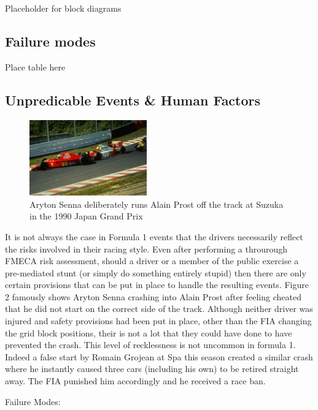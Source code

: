 \documentclass[12pt]{article} %
\begin{document}
Placeholder for block diagrams

\subsection{Failure modes}

Place table here

\subsection{Unpredicable Events \& Human Factors} %


\begin{figure} %
  \begin{center}
    \includegraphics[width=0.45\textwidth]{senna-prost}
  \end{center}
\parbox{7cm}{\caption{Aryton Senna deliberately runs Alain Prost off the track at Suzuka in the 1990 Japan Grand Prix}}
\end{figure}

It is not always the case in Formula 1 events that the drivers necessarily reflect the risks involved in their racing style. Even after performing a throurough FMECA risk assessment, should a driver or a member of the public exercise a pre-mediated stunt (or simply do something entirely stupid) then there are only certain provisions that can be put in place to handle the resulting events. Figure 2 famously shows Aryton Senna crashing into Alain Prost after feeling cheated that he did not start on the correct side of the track. Although neither driver was injured and safety provisions had been put in place, other than the FIA changing the grid block positions, their is not a lot that they could have done to have prevented the crash. This level of recklessness is not uncommon in formula 1. Indeed a false start by Romain Grojean at Spa this season created a similar crash where he instantly caused three cars (including his own) to be retired straight away. The FIA punished him accordingly and he received a race ban. 

Failure Modes:
\end{document}

